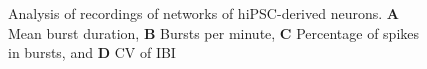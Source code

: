 \documentclass[12pt, titlepage]{article}
\begin{document}
		\begin{figure}[h]
			\centering
			\caption{Analysis of recordings of networks of hiPSC-derived neurons. \textbf{A} Mean burst duration, \textbf{B} Bursts per minute, \textbf{C} Percentage of spikes in bursts, and \textbf{D} CV of IBI}
			\label{hiPSN_results}
		\end{figure}
\end{document}
